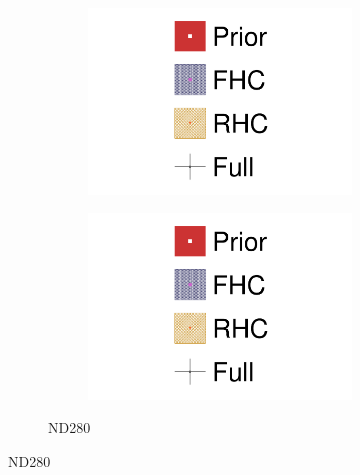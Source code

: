 \begin{figure}[h]
\begin{subfigure}[t]{\textwidth}
\begin{subfigure}[t]{0.24\textwidth}
			\includegraphics[width=\textwidth,page=4, trim={0mm 0mm 0mm 9mm}, clip]{figures/mach3/2018/data/2018a_FixedCov_RedCov_Mpi_NeuOnly_Data_merge_2018a_FixedCov_RedCov_Mpi_NeuBarOnly_Data_merge_2018a_FixedCov_RedCov_Mpi_Data_merge}
		\end{subfigure}
		\begin{subfigure}[t]{0.24\textwidth}
			\includegraphics[width=\textwidth,page=5, trim={0mm 0mm 0mm 9mm}, clip]{figures/mach3/2018/data/2018a_FixedCov_RedCov_Mpi_NeuOnly_Data_merge_2018a_FixedCov_RedCov_Mpi_NeuBarOnly_Data_merge_2018a_FixedCov_RedCov_Mpi_Data_merge}
		\end{subfigure}
		\caption{ND280}
	\end{subfigure}
	

\end{figure}
